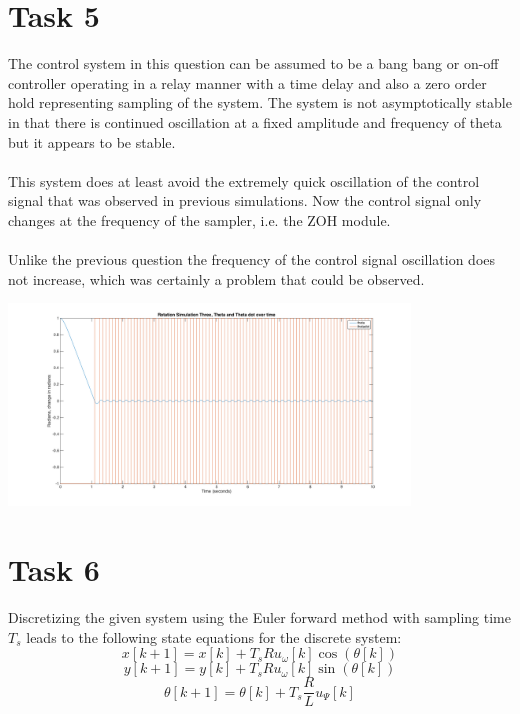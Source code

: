 \documentclass[a4paper,12pt,oneside,onecolumn]{article} %
\begin{document}
\section*{Task 5}

The control system in this question can be assumed
to be a bang bang or on-off controller operating in a relay manner with a time delay and also a zero order hold representing sampling of the system. The system is not asymptotically stable in that there is continued oscillation at a fixed amplitude and frequency of theta but it appears to be stable.\\
\\
This system does at least avoid the extremely quick oscillation of the control signal that was observed in previous simulations. Now the control signal only changes at the frequency of the sampler, i.e. the ZOH module.\\
\\
Unlike the previous question the frequency of the control signal oscillation does not increase, which was certainly a problem that could be observed.
 \begin{center}
  \includegraphics[width = 0.8\textwidth]{q5plot}
 \end{center}
\section*{Task 6}

Discretizing the given system using the Euler forward method with sampling time $T_s$ leads to the following state equations for the discrete system:
\begin{equation}
\label{eq:xdiscrete}
	x[k+1]=x[k]+T_s R u_\omega[k] \cos{(\theta[k])}
\end{equation}
\begin{equation}
\label{eq:ydiscrete}
	y[k+1]=y[k]+T_s R u_\omega[k] \sin{(\theta[k])}
\end{equation}
\begin{equation}
\label{eq:thetadiscrete}
	\theta[k+1]=\theta[k]+T_s \frac{R}{L } u_\Psi[k]
\end{equation}
\end{document}
